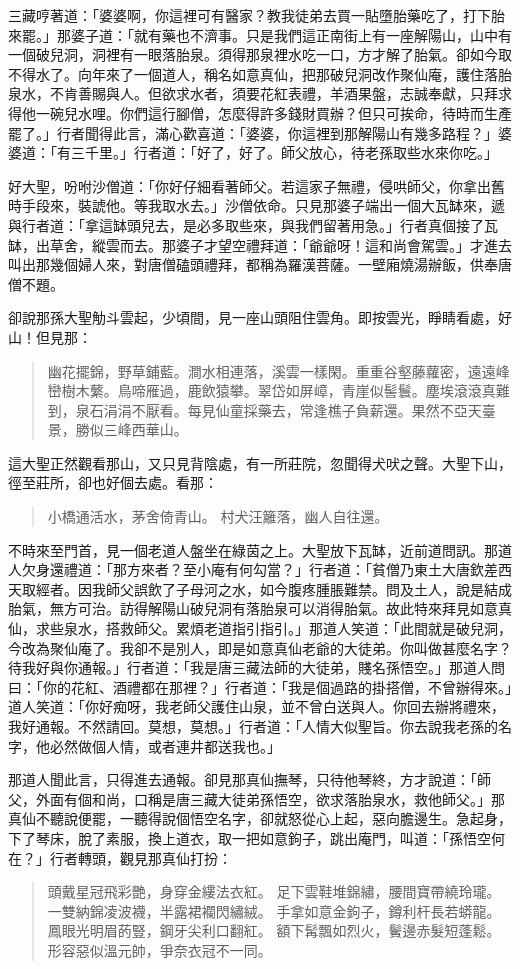 三藏哼著道：「婆婆啊，你這裡可有醫家？教我徒弟去買一貼墮胎藥吃了，打下胎來罷。」那婆子道：「就有藥也不濟事。只是我們這正南街上有一座解陽山，山中有一個破兒洞，洞裡有一眼落胎泉。須得那泉裡水吃一口，方才解了胎氣。卻如今取不得水了。向年來了一個道人，稱名如意真仙，把那破兒洞改作聚仙庵，護住落胎泉水，不肯善賜與人。但欲求水者，須要花紅表禮，羊酒果盤，志誠奉獻，只拜求得他一碗兒水哩。你們這行腳僧，怎麼得許多錢財買辦？但只可挨命，待時而生產罷了。」行者聞得此言，滿心歡喜道：「婆婆，你這裡到那解陽山有幾多路程？」婆婆道：「有三千里。」行者道：「好了，好了。師父放心，待老孫取些水來你吃。」

好大聖，吩咐沙僧道：「你好仔細看著師父。若這家子無禮，侵哄師父，你拿出舊時手段來，裝諕他。等我取水去。」沙僧依命。只見那婆子端出一個大瓦缽來，遞與行者道：「拿這缽頭兒去，是必多取些來，與我們留著用急。」行者真個接了瓦缽，出草舍，縱雲而去。那婆子才望空禮拜道：「爺爺呀！這和尚會駕雲。」才進去叫出那幾個婦人來，對唐僧磕頭禮拜，都稱為羅漢菩薩。一壁廂燒湯辦飯，供奉唐僧不題。

卻說那孫大聖觔斗雲起，少頃間，見一座山頭阻住雲角。即按雲光，睜睛看處，好山！但見那：
\begin{quote}
幽花擺錦，野草鋪藍。澗水相連落，溪雲一樣閑。重重谷壑藤蘿密，遠遠峰巒樹木蘩。鳥啼雁過，鹿飲猿攀。翠岱如屏嶂，青崖似髻鬟。塵埃滾滾真難到，泉石涓涓不厭看。每見仙童採藥去，常逢樵子負薪還。果然不亞天臺景，勝似三峰西華山。
\end{quote}

這大聖正然觀看那山，又只見背陰處，有一所莊院，忽聞得犬吠之聲。大聖下山，徑至莊所，卻也好個去處。看那：
\begin{quote}
小橋通活水，茅舍倚青山。
村犬汪籬落，幽人自往還。
\end{quote}

不時來至門首，見一個老道人盤坐在綠茵之上。大聖放下瓦缽，近前道問訊。那道人欠身還禮道：「那方來者？至小庵有何勾當？」行者道：「貧僧乃東土大唐欽差西天取經者。因我師父誤飲了子母河之水，如今腹疼腫脹難禁。問及土人，說是結成胎氣，無方可治。訪得解陽山破兒洞有落胎泉可以消得胎氣。故此特來拜見如意真仙，求些泉水，搭救師父。累煩老道指引指引。」那道人笑道：「此間就是破兒洞，今改為聚仙庵了。我卻不是別人，即是如意真仙老爺的大徒弟。你叫做甚麼名字？待我好與你通報。」行者道：「我是唐三藏法師的大徒弟，賤名孫悟空。」那道人問曰：「你的花紅、酒禮都在那裡？」行者道：「我是個過路的掛搭僧，不曾辦得來。」道人笑道：「你好痴呀，我老師父護住山泉，並不曾白送與人。你回去辦將禮來，我好通報。不然請回。莫想，莫想。」行者道：「人情大似聖旨。你去說我老孫的名字，他必然做個人情，或者連井都送我也。」

那道人聞此言，只得進去通報。卻見那真仙撫琴，只待他琴終，方才說道：「師父，外面有個和尚，口稱是唐三藏大徒弟孫悟空，欲求落胎泉水，救他師父。」那真仙不聽說便罷，一聽得說個悟空名字，卻就怒從心上起，惡向膽邊生。急起身，下了琴床，脫了素服，換上道衣，取一把如意鉤子，跳出庵門，叫道：「孫悟空何在？」行者轉頭，觀見那真仙打扮：
\begin{quote}
頭戴星冠飛彩艷，身穿金縷法衣紅。
足下雲鞋堆錦繡，腰間寶帶繞玲瓏。
一雙納錦凌波襪，半露裙襴閃繡絨。
手拿如意金鉤子，鐏利杆長若蟒龍。
鳳眼光明眉菂豎，鋼牙尖利口翻紅。
額下髯飄如烈火，鬢邊赤髮短蓬鬆。
形容惡似溫元帥，爭奈衣冠不一同。
\end{quote}

